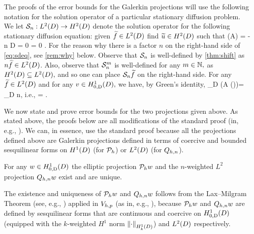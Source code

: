 The proofs of the error bounds for the Galerkin projections will use the following notation for the solution operator of a particular stationary diffusion problem. We let $\DeltaAI:\LtD\rightarrow\HtD$ denote the solution operator for the following stationary diffusion equation: given $\ftilde \in \LtD$ find $\utilde \in \HtD$ such that
\beq\label{eq:sdeq}
\grad \cdot \mleft(A\grad \utilde\mright) = -n\ftilde {} D
\eeq
\beq\label{eq:sddbc}
\trD \utilde = 0 \ton \GD
\eeq
\beq\label{eq:sdnbc}
\dn \utilde = 0 \ton \GI.
\eeq
For the reason why there is a factor $n$ on the right-hand side of \cref{eq:sdeq}, see \cref{rem:why} below. Observe that $\mathcal S_{n}$ is well-defined by \cref{thm:shift} as $n \ftilde \in \LtD$. Also, observe that $\mathcal S_{n}^{m}$ is well-defined for any $m \in \mathbb N,$ as $\HtD \subseteq \LtD,$ and so one can place $\mathcal S_{n} \widetilde{f}$ on the right-hand side. 
For any $\ftilde \in \LtD$ and for any $v \in \HozDD,$ we have, by Green's identity,
\beqs
\int_D \mleft(A \grad \mleft(\DeltaAI\ftilde\mright)\mright)\cdot \grad \vb = \int_D n\ftilde \vb,
\eeqs
i.e.,
\beq\label{eq:deltaagreen}
 = .
\eeq




We now state and prove error bounds for the two projections given above. As stated above, the proofs below are all modifications of the standard proof (in, e.g., \cite[Theorem 5.8.3]{BrSc:08}). We can, in essence, use the standard proof because all the projections defined above are Galerkin projections defined in terms of coercive and bounded sesquilinear forms on $\HoD$ (for $\mathcal P_{h}$) or $\LtD$ (for $Q_{h,n}$).

\label{lem:eugp}
For any $w \in \HozDD$ the elliptic projection $\mathcal P_{h} w$ and the $n$-weighted $L^2$ projection $Q_{h,n} w$ exist and are unique.
\ele

The existence and uniqueness of $\mathcal P_{h} w$ and $Q_{h,n} w$ follows from the Lax--Milgram Theorem (see, e.g., \cite[Theorem 2.7.7]{BrSc:08}) applied in $V_{h,p}$ (as in, e.g., \cite[Corollary 2.7.13]{BrSc:08}), because $\mathcal P_{h} w$ and $Q_{h,n} w$ are defined by sesquilinear forms that are continuous and coercive on $\HozDD$ (equipped with the $k$-weighted $H^1$ norm $\NHokD{\cdot}$) and $\LtD$ respectively.

